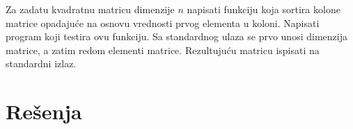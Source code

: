 \begin{Answer}[ref=526]
\end{Answer}
\begin{Exercise}[label=527]
  Za zadatu kvadratnu matricu dimenzije $n$ napisati funkciju koja
  sortira kolone matrice opadajuće na osnovu vrednosti prvog
  elementa u koloni.  Napisati program koji testira ovu funkciju. Sa
  standardnog ulaza se prvo unosi dimenzija matrice, a zatim redom
  elementi matrice.  Rezultujuću matricu ispisati na standardni izlaz.
  
\end{Exercise}


\section{Rešenja}
\shipoutAnswer


